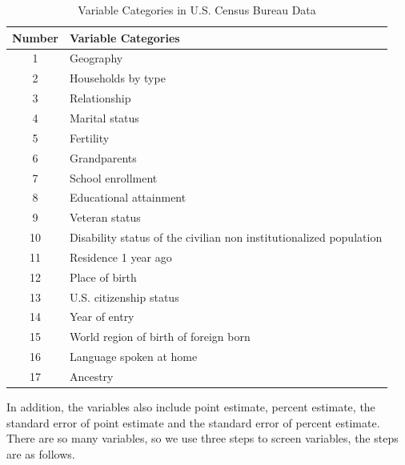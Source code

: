 \documentclass{mcmthesis}
\numberwithin{equation}{section}
\numberwithin{figure}{section}
\numberwithin{table}{section}
\theoremstyle{mydef}
\begin{document}
\vspace{-0.3cm}
\begin{table}[htbp]
  \centering
  \caption{Variable Categories in U.S. Census Bureau Data}
    \begin{tabular}{cl}
    \addlinespace
    \toprule[1.5pt]
    Number & Variable Categories \\
    \midrule[1pt]
        1     & Geography \\
    2     & Households by type \\
    3     & Relationship \\
    4     & Marital status \\
    5     & Fertility \\
    6     & Grandparents \\
    7     & School enrollment \\
    8     & Educational attainment \\
    9     & Veteran status \\
    10    & Disability status of the civilian non institutionalized population \\
    11    & Residence 1 year ago \\
    12    & Place of birth \\
    13    & U.S. citizenship status \\
    14    & Year of entry \\
    15    & World region of birth of foreign born \\
    16    & Language spoken at home \\
    17    & Ancestry \\
    \bottomrule[1.5pt]
    \end{tabular}%
  \label{tab:p2i}%
\end{table}%

In addition, the variables also include point estimate, percent estimate, the standard error of point estimate and the standard error of percent estimate.
There are so many variables, so we use three steps to screen variables, the steps are as follows.
\end{document}
